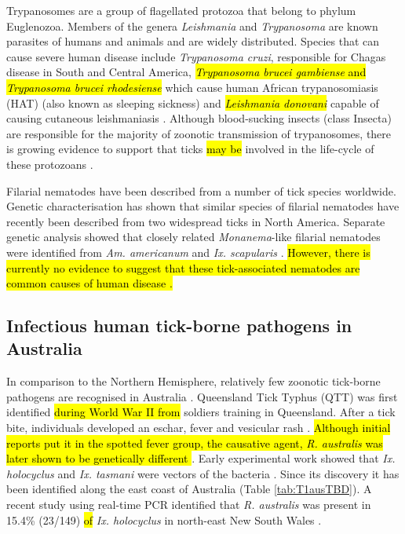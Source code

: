 \documentclass[a4paper, nobind]{templates/ociamthesis}
\begin{document}
Trypanosomes are a group of flagellated protozoa that belong to phylum Euglenozoa.
Members of the genera \emph{Leishmania} and \emph{Trypanosoma} are known parasites of humans and animals and are widely distributed.
Species that can cause severe human disease include \emph{Trypanosoma cruzi}, responsible for Chagas disease in South and Central America, \hl{\emph{Trypanosoma brucei gambiense} and \emph{Trypanosoma brucei rhodesiense}} which cause human African trypanosomiasis (HAT) (also known as sleeping sickness) and \hl{\emph{Leishmania donovani}} capable of causing cutaneous leishmaniasis \autocite{kauferReviewSystematicsSpecies2020}.
Although blood-sucking insects (class Insecta) are responsible for the majority of zoonotic transmission of trypanosomes, there is growing evidence to support that ticks \hl{may be} involved in the life-cycle of these protozoans \autocite{morzariaTransmissionTrypanosomaSp1986,thekisoeTrypanosomeSpeciesIsolated2007}.

Filarial nematodes have been described from a number of tick species worldwide.
Genetic characterisation has shown that similar species of filarial nematodes have recently been described from two widespread ticks in North America.
Separate genetic analysis showed that closely related \emph{Monanema}-like filarial nematodes were identified from \emph{Am. americanum} \autocite{henningDiscoveryFilarialNematode2016} and \emph{Ix. scapularis} \autocite{tokarzCharacterizationMonanemaNematode2020}.
\hl{However, there is currently no evidence to suggest that these tick-associated nematodes are common causes of human disease \autocite{tokarzCharacterizationMonanemaNematode2020}.}

\hypertarget{infectious-human-tick-borne-pathogens-in-australia}{%
\subsection{Infectious human tick-borne pathogens in Australia}\label{infectious-human-tick-borne-pathogens-in-australia}}

In comparison to the Northern Hemisphere, relatively few zoonotic tick-borne pathogens are recognised in Australia \autocite{madison-antenucciEmergingTickBorneDiseases2020,rochlinEmergingTickbornePathogens2020}.
Queensland Tick Typhus (QTT) was first identified \hl{during World War II from} soldiers training in Queensland.
After a tick bite, individuals developed an eschar, fever and vesicular rash \autocite{andrewTickTyphusNorth1946}.
\hl{Although initial reports put it in the spotted fever group, the causative agent, \emph{R. australis} was later shown to be genetically different \autocite{stenosRickettsialOutermembraneProtein2000}}.
Early experimental work showed that \emph{Ix. holocyclus} and \emph{Ix. tasmani} were vectors of the bacteria \autocite{campbellRickettsiosesAustraliaIsolation1974}.
Since its discovery it has been identified along the east coast of Australia \autocite{campbellQueenslandTickTyphus1979,wilsonQueenslandTickTyphus2013,fergieQueenslandTickTyphus2017} (Table \ref{tab:T1ausTBD}).
A recent study using real-time PCR identified that \emph{R. australis} was present in 15.4\% (23/149) \hl{of} \emph{Ix. holocyclus} in north-east New South Wales \autocite{gravesIxodesHolocyclusTicktransmitted2016}.
\end{document}
